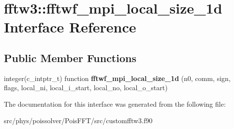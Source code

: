 \hypertarget{interfacefftw3_1_1fftwf__mpi__local__size__1d}{}\section{fftw3\+:\+:fftwf\+\_\+mpi\+\_\+local\+\_\+size\+\_\+1d Interface Reference}
\label{interfacefftw3_1_1fftwf__mpi__local__size__1d}
\subsection*{Public Member Functions}
\begin{DoxyCompactItemize}
\item 
integer(c\+\_\+intptr\+\_\+t) function {\bfseries fftwf\+\_\+mpi\+\_\+local\+\_\+size\+\_\+1d} (n0, comm, sign, flags, local\+\_\+ni, local\+\_\+i\+\_\+start, local\+\_\+no, local\+\_\+o\+\_\+start)\hypertarget{interfacefftw3_1_1fftwf__mpi__local__size__1d_a89abc829f5daf8a825b7a31e901443b8}{}\label{interfacefftw3_1_1fftwf__mpi__local__size__1d_a89abc829f5daf8a825b7a31e901443b8}

\end{DoxyCompactItemize}


The documentation for this interface was generated from the following file\+:\begin{DoxyCompactItemize}
\item 
src/phys/poissolver/\+Pois\+F\+F\+T/src/customfftw3.\+f90\end{DoxyCompactItemize}
